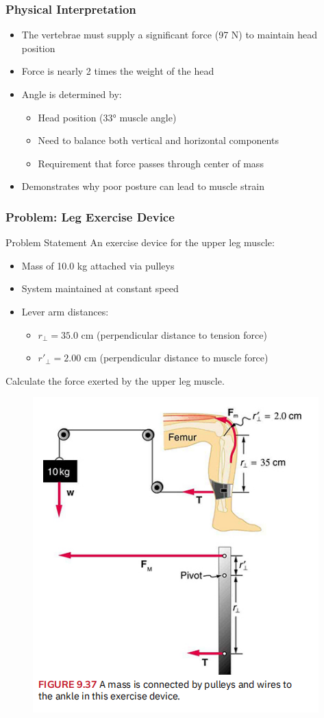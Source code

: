 \documentclass{beamer}
\begin{document}
\begin{frame}
\frametitle{Physical Interpretation}
\begin{itemize}
    \item The vertebrae must supply a significant force (97 N) to maintain head position
    \item Force is nearly 2 times the weight of the head
    \item Angle is determined by:
    \begin{itemize}
        \item Head position (33° muscle angle)
        \item Need to balance both vertical and horizontal components
        \item Requirement that force passes through center of mass
    \end{itemize}
    \item Demonstrates why poor posture can lead to muscle strain
\end{itemize}
\end{frame}




\begin{frame}
\frametitle{Problem: Leg Exercise Device}
\begin{block}{Problem Statement}
An exercise device for the upper leg muscle:
\begin{itemize}
    \item Mass of 10.0 kg attached via pulleys
    \item System maintained at constant speed
    \item Lever arm distances:
    \begin{itemize}
        \item $r_\perp = 35.0$ cm (perpendicular distance to tension force)
        \item $r'_\perp = 2.00$ cm (perpendicular distance to muscle force)
    \end{itemize}
\end{itemize}
Calculate the force exerted by the upper leg muscle.
\end{block}
\begin{figure}
    \centering
    \includegraphics[width=0.5\linewidth]{CH9.5 4,5,9 Review/Screenshot 2024-11-12 134327.png}
\end{figure}
\end{frame}
\end{document}
